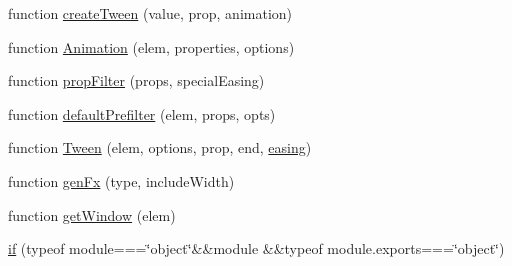 \begin{DoxyCompactItemize}
\item 
function \hyperlink{_scripts_2jquery-1_810_82_8js_a0c2043fcd2fa684768877127fbbc2e55}{create\+Tween} (value, prop, animation)
\item 
function \hyperlink{_scripts_2jquery-1_810_82_8js_aa33f7dcb8ee41587d545a0bc69849296}{Animation} (elem, properties, options)
\item 
function \hyperlink{_scripts_2jquery-1_810_82_8js_a0196d1f08ae60b747901b5a2950f72f1}{prop\+Filter} (props, special\+Easing)
\item 
function \hyperlink{_scripts_2jquery-1_810_82_8js_a8041b1040535dcee84ad474aaaf11dde}{default\+Prefilter} (elem, props, opts)
\item 
function \hyperlink{_scripts_2jquery-1_810_82_8js_adcb517ce3709049d37bb5f5bd3811edf}{Tween} (elem, options, prop, end, \hyperlink{_scripts_2jquery-1_810_82_8js_a9758a312629fa6de1744280dd6e6253b}{easing})
\item 
function \hyperlink{_scripts_2jquery-1_810_82_8js_a0dad9ae6c57fd32a071de202faa87081}{gen\+Fx} (type, include\+Width)
\item 
function \hyperlink{_scripts_2jquery-1_810_82_8js_ab8e6e1fb3b8b51b6afe437c63df0e09f}{get\+Window} (elem)
\item 
\hyperlink{_scripts_2jquery-1_810_82_8js_aa2cebb51f03a2e3ab2af45a3f9241c96}{if} (typeof module===\char`\"{}object\char`\"{}\&\&module \&\&typeof module.\+exports===\char`\"{}object\char`\"{})
\end{DoxyCompactItemize}
